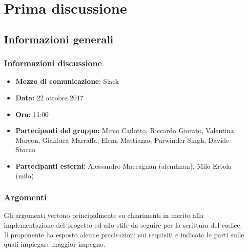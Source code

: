 \documentclass[main.tex]{subfiles}
\begin{document}
\chapter{Prima discussione}
\section{Informazioni generali}
\subsection{Informazioni discussione}
\begin{itemize}
	\item \textbf{Mezzo di comunicazione:} Slack
	\item \textbf{Data:} 22 ottobre 2017
	\item \textbf{Ora:} 11:00
	\item \textbf{Partecipanti del gruppo:} Mirco Cailotto, Riccardo Giorato, Valentina Marcon, Gianluca Marraffa, Elena Mattiazzo, Parwinder Singh, Davide Stocco
	\item \textbf{Partecipanti esterni:} Alessandro Maccagnan (alemhnan), Milo Ertola (milo)
\end{itemize}
\subsection{Argomenti}
	Gli argomenti vertono principalmente su chiarimenti in merito alla implementazione del progetto ed allo stile da seguire per la scrittura del codice.\\
	Il proponente ha esposto alcune precisazioni sui requisiti e indicato le parti sulle quali impiegare maggior impegno.
\end{document}
